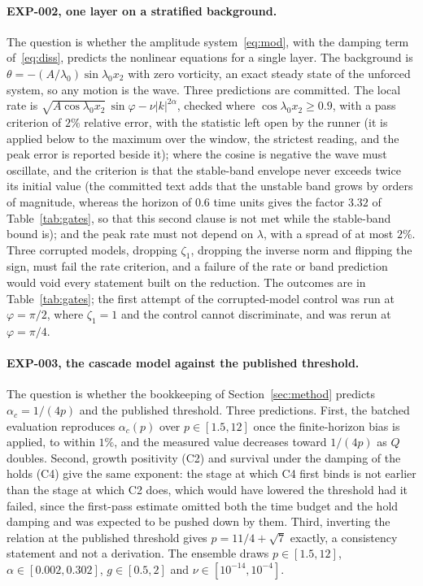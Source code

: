 \documentclass[11pt]{article}
\theoremstyle{remark}
\begin{document}
\paragraph{EXP-002, one layer on a stratified background.} The question is whether the amplitude
system~\eqref{eq:mod}, with the damping term of~\eqref{eq:diss}, predicts the nonlinear equations for a single
layer. The background is $\theta=-(A/\lambda_{0})\sin\lambda_{0}x_{2}$ with zero vorticity, an exact steady
state of the unforced system, so any motion is the wave. Three predictions are committed. The local rate is
$\sqrt{A\cos\lambda_{0}x_{2}}\,\sin\varphi-\nu|k|^{2\alpha}$, checked where $\cos\lambda_{0}x_{2}\ge0.9$, with a
pass criterion of $2\%$ relative error, with the statistic left open by the runner (it is applied below to the maximum over the window, the strictest reading, and the peak error is reported beside it); where the cosine is negative the wave must oscillate, and the criterion
is that the stable-band envelope never exceeds twice its initial value (the committed text adds that the
unstable band grows by orders of magnitude, whereas the horizon of $0.6$ time units gives the factor $3.32$ of
Table~\ref{tab:gates}, so that this second clause is not met while the stable-band bound is); and the peak rate must not depend on $\lambda$, with a spread of at most $2\%$. Three corrupted
models, dropping $\zeta_{1}$, dropping the inverse norm and flipping the sign, must fail the rate criterion, and
a failure of the rate or band prediction would void every statement built on the reduction. The outcomes are in
Table~\ref{tab:gates}; the first attempt of the corrupted-model control was run at $\varphi=\pi/2$, where
$\zeta_{1}=1$ and the control cannot discriminate, and was rerun at $\varphi=\pi/4$.

\paragraph{EXP-003, the cascade model against the published threshold.} The question is whether the
bookkeeping of Section~\ref{sec:method} predicts $\alpha_{c}=1/(4p)$ and the published threshold. Three
predictions. First, the batched evaluation reproduces $\alpha_{c}(p)$ over $p\in[1.5,12]$ once the finite-horizon
bias is applied, to within $1\%$, and the measured value decreases toward $1/(4p)$ as $Q$ doubles. Second, growth
positivity (C2) and survival under the damping of the holds (C4) give the same exponent: the stage at which
C4 first binds is not earlier than the stage at which C2 does, which would have lowered the threshold had it
failed, since the first-pass estimate omitted both the time budget and the hold damping and was expected to
be pushed down by them. Third, inverting the relation at the published threshold gives $p=11/4+\sqrt7$
exactly, a consistency statement and not a derivation. The ensemble draws $p\in[1.5,12]$, $\alpha\in[0.002,0.302]$,
$g\in[0.5,2]$ and $\nu\in[10^{-14},10^{-4}]$.
\end{document}
